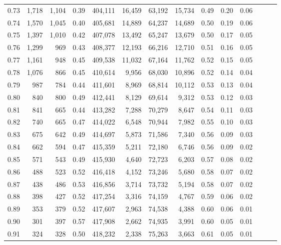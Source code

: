 \begin{tabular}{rrrrrrrrrrrrrr}
0.73 &  1,718 &  1,104 &  0.39 &  404,111 &   16,459 &  63,192 &  15,734 &  0.49 &  0.20 &      0.06 \\
0.74 &  1,570 &  1,045 &  0.40 &  405,681 &   14,889 &  64,237 &  14,689 &  0.50 &  0.19 &      0.06 \\
0.75 &  1,397 &  1,010 &  0.42 &  407,078 &   13,492 &  65,247 &  13,679 &  0.50 &  0.17 &      0.05 \\
0.76 &  1,299 &    969 &  0.43 &  408,377 &   12,193 &  66,216 &  12,710 &  0.51 &  0.16 &      0.05 \\
0.77 &  1,161 &    948 &  0.45 &  409,538 &   11,032 &  67,164 &  11,762 &  0.52 &  0.15 &      0.05 \\
0.78 &  1,076 &    866 &  0.45 &  410,614 &    9,956 &  68,030 &  10,896 &  0.52 &  0.14 &      0.04 \\
0.79 &    987 &    784 &  0.44 &  411,601 &    8,969 &  68,814 &  10,112 &  0.53 &  0.13 &      0.04 \\
0.80 &    840 &    800 &  0.49 &  412,441 &    8,129 &  69,614 &   9,312 &  0.53 &  0.12 &      0.03 \\
0.81 &    841 &    665 &  0.44 &  413,282 &    7,288 &  70,279 &   8,647 &  0.54 &  0.11 &      0.03 \\
0.82 &    740 &    665 &  0.47 &  414,022 &    6,548 &  70,944 &   7,982 &  0.55 &  0.10 &      0.03 \\
0.83 &    675 &    642 &  0.49 &  414,697 &    5,873 &  71,586 &   7,340 &  0.56 &  0.09 &      0.03 \\
0.84 &    662 &    594 &  0.47 &  415,359 &    5,211 &  72,180 &   6,746 &  0.56 &  0.09 &      0.02 \\
0.85 &    571 &    543 &  0.49 &  415,930 &    4,640 &  72,723 &   6,203 &  0.57 &  0.08 &      0.02 \\
0.86 &    488 &    523 &  0.52 &  416,418 &    4,152 &  73,246 &   5,680 &  0.58 &  0.07 &      0.02 \\
0.87 &    438 &    486 &  0.53 &  416,856 &    3,714 &  73,732 &   5,194 &  0.58 &  0.07 &      0.02 \\
0.88 &    398 &    427 &  0.52 &  417,254 &    3,316 &  74,159 &   4,767 &  0.59 &  0.06 &      0.02 \\
0.89 &    353 &    379 &  0.52 &  417,607 &    2,963 &  74,538 &   4,388 &  0.60 &  0.06 &      0.01 \\
0.90 &    301 &    397 &  0.57 &  417,908 &    2,662 &  74,935 &   3,991 &  0.60 &  0.05 &      0.01 \\
0.91 &    324 &    328 &  0.50 &  418,232 &    2,338 &  75,263 &   3,663 &  0.61 &  0.05 &      0.01 \\

\end{tabular}
